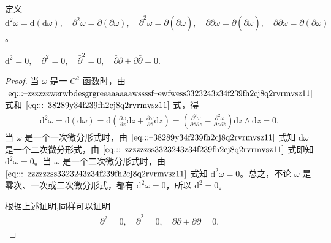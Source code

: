 \documentclass[../../main.tex]{subfiles}%
\begin{document}
\begin{definition}
定义 \( \mathrm{d}^2\omega = \mathrm{d}(\mathrm{d}\omega),\quad \partial^2\omega = \partial(\partial\omega),\quad \bar{\partial}^2\omega = \bar{\partial}(\bar{\partial}\omega),\quad \partial\bar{\partial}\omega = \partial(\bar{\partial}\omega) ,\quad \bar{\partial}\partial\omega = \bar{\partial}(\partial\omega) \)。
\end{definition}

\begin{proposition}
$\mathrm{d}^2 = 0 , \quad\partial^2 = 0, \quad
\bar{\partial}^2 = 0, \quad
\bar{\partial}\partial + \partial\bar{\partial} = 0.$
\end{proposition}
\begin{proof}
当 \( \omega \) 是一 \( C^2 \) 函数时，由 \(\eqref{eq:::--zzzzzzwerwbdesgrgreeaaaaaawssssf--ewfwess3323243z34f239fh2cj8q2rvrmvsz11}\) 式和 \(\eqref{eq:::--38289y34f239fh2cj8q2rvrmvsz11}\) 式，得
\begin{align*}
\mathrm{d}^2\omega = \mathrm{d}(\mathrm{d}\omega) = \mathrm{d}\left( \frac{\partial \omega}{\partial z}\mathrm{d}z + \frac{\partial \omega}{\partial \bar{z}}\mathrm{d}\bar{z} \right) = \left( \frac{\partial^2 \omega}{\partial \bar{z}\partial z} - \frac{\partial^2 \omega}{\partial z\partial \bar{z}} \right) \mathrm{d}z \wedge \mathrm{d}\bar{z} = 0. 
\end{align*}
当 \( \omega \) 是一个一次微分形式时，由 \(\eqref{eq:::--38289y34f239fh2cj8q2rvrmvsz11}\) 式知 \( \mathrm{d}\omega \) 是一个二次微分形式，由 \(\eqref{eq:::--zzzzzzss3323243z34f239fh2cj8q2rvrmvsz11}\) 式即知 \( \mathrm{d}^2\omega = 0 \)。当 \( \omega \) 是一个二次微分形式时，由 \(\eqref{eq:::--zzzzzzss3323243z34f239fh2cj8q2rvrmvsz11}\) 式知 \( \mathrm{d}^2\omega = 0 \)。总之，不论 \( \omega \) 是零次、一次或二次微分形式，都有 \( \mathrm{d}^2\omega = 0 \)，所以 \( \mathrm{d}^2 = 0 \)。

根据上述证明,同样可以证明
\begin{align*}
\partial^2 = 0, \quad
\bar{\partial}^2 = 0, \quad
\bar{\partial}\partial + \partial\bar{\partial} = 0. 
\end{align*}
\end{proof}
\end{document}
